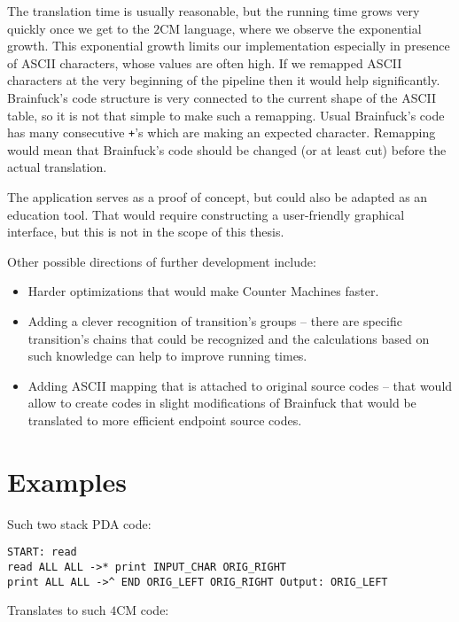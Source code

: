 \documentclass[english,shortabstract,mgr]{iithesis}
\begin{document}
The translation time is usually reasonable, but the running time grows
very quickly once we get to the $2$CM language, where we observe the exponential growth.
This exponential growth limits our implementation especially in presence of ASCII
characters, whose values are often high.
If we remapped ASCII characters at the very beginning of the pipeline
then it would help significantly. Brainfuck's code structure is very connected
to the current shape of the ASCII table, so it is not that simple to make such a remapping.
Usual Brainfuck's code has many consecutive \texttt{+}'s which are making
an expected character. Remapping would mean that Brainfuck's code should be changed
(or at least cut) before the actual translation.

The application serves as a proof of concept, but could also be adapted
as an education tool. That would require constructing a user-friendly
graphical interface, but this is not in the scope of this thesis.

Other possible directions of further development include:
\begin{itemize}
  \item Harder optimizations that would make Counter Machines faster.
  \item Adding a clever recognition of transition's groups -- there are specific
      transition's chains that could be recognized and the calculations
      based on such knowledge can help to improve running times.
  \item Adding ASCII mapping that is attached to original source codes -- that
      would allow to create codes in slight modifications of Brainfuck that
      would be translated to more efficient endpoint source codes.
\end{itemize}



{}

\appendix

\chapter{Examples}


Such two stack PDA code:

\begin{verbatim}
START: read
read ALL ALL ->* print INPUT_CHAR ORIG_RIGHT
print ALL ALL ->^ END ORIG_LEFT ORIG_RIGHT Output: ORIG_LEFT
\end{verbatim}

Translates to such $4$CM code:
\end{document}
